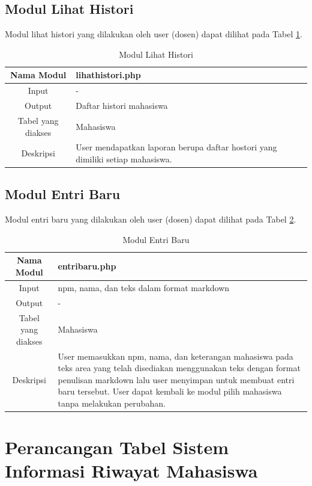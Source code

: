 \subsection{Modul Lihat Histori}
Modul lihat histori yang dilakukan oleh user (dosen) dapat dilihat pada Tabel
\ref{tab:modullihathistori}.

\begin{table}[h]
\centering
\caption[Tabel 4-5 Modul Lihat Histori]{Modul Lihat Histori}
\label{tab:modullihathistori}
\begin{tabular}{|c|p{7cm}|}
\hline
Nama Modul & lihathistori.php\\
\hline
Input & -\\
\hline
Output & Daftar histori mahasiswa\\
\hline
Tabel yang diakses & Mahasiswa\\
\hline
Deskripsi & User mendapatkan laporan berupa daftar hostori yang dimiliki setiap
mahasiswa.\\
\hline
\end{tabular}
\end{table}

\subsection{Modul Entri Baru}
Modul entri baru yang dilakukan oleh user (dosen) dapat dilihat pada Tabel
\ref{tab:modulentribaru}.

\begin{table}[h]
\centering
\caption[Tabel 4-6 Modul Entri Baru]{Modul Entri Baru} 
\label{tab:modulentribaru}
\begin{tabular}{|c|p{7cm}|}
\hline
Nama Modul & entribaru.php\\
\hline
Input & npm, nama, dan teks dalam format markdown\\
\hline
Output & -\\
\hline
Tabel yang diakses & Mahasiswa\\
\hline
Deskripsi & User memasukkan npm, nama, dan keterangan mahasiswa pada teks area
yang telah disediakan menggunakan teks dengan format penulisan markdown lalu
user menyimpan untuk membuat entri baru tersebut. User dapat kembali ke modul
pilih mahasiswa tanpa melakukan perubahan.\\
\hline
\end{tabular}
\end{table}

\section{Perancangan Tabel Sistem Informasi Riwayat Mahasiswa}
\label{sec:perancangantabel}

